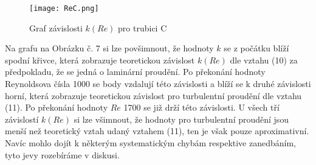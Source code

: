 \documentclass[a4paper]{article}
\begin{document}
\begin{figure}[H]
\centering
\texttt{[image: ReC.png]}
\caption{Graf závislosti $k(Re)$ pro trubici C}
\end{figure}
\par Na grafu na Obrázku č. 7 si lze povšimnout, že hodnoty $k$ se z počátku blíží spodní křivce, která zobrazuje teoretickou závislost $k(Re)$ dle vztahu (10) za předpokladu, že se jedná o laminární proudění. Po překonání hodnoty Reynoldsova čísla 1000 se body vzdalují této závislosti a blíží se k druhé závislosti horní, která zobrazuje teoretickou závislost pro turbulentní proudění dle vztahu (11). Po překonání hodnoty $Re$ 1700 se již drží této závislosti. U všech tří závislostí $k(Re)$ si lze všimnout, že hodnoty pro turbulentní proudění jsou menší než teoretický vztah udaný vztahem (11), ten je však pouze aproximativní. Navíc mohlo dojít k některým systematickým chybám respektive zanedbáním, tyto jevy rozebíráme v diskusi.
\end{document}
